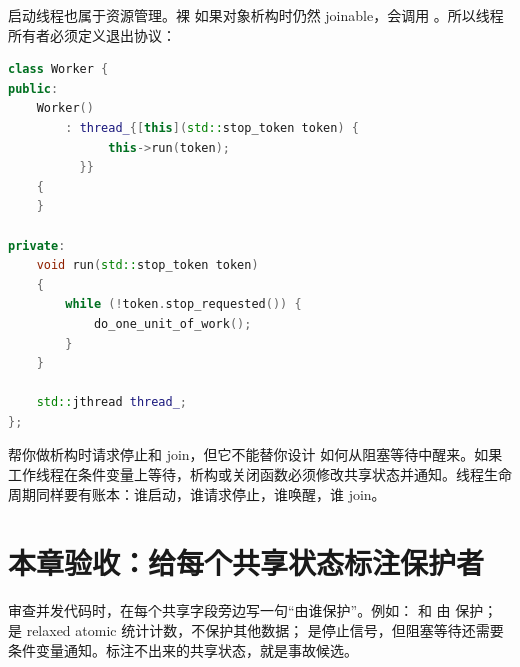 启动线程也属于资源管理。裸  如果对象析构时仍然 joinable，会调用 。所以线程所有者必须定义退出协议：

\begin{lstlisting}[language=C++,caption={工作线程所有者的基本形状}]
class Worker {
public:
    Worker()
        : thread_{[this](std::stop_token token) {
              this->run(token);
          }}
    {
    }

private:
    void run(std::stop_token token)
    {
        while (!token.stop_requested()) {
            do_one_unit_of_work();
        }
    }

    std::jthread thread_;
};
\end{lstlisting}

 帮你做析构时请求停止和 join，但它不能替你设计  如何从阻塞等待中醒来。如果工作线程在条件变量上等待，析构或关闭函数必须修改共享状态并通知。线程生命周期同样要有账本：谁启动，谁请求停止，谁唤醒，谁 join。

\section{本章验收：给每个共享状态标注保护者}

审查并发代码时，在每个共享字段旁边写一句“由谁保护”。例如： 和  由  保护； 是 relaxed atomic 统计计数，不保护其他数据； 是停止信号，但阻塞等待还需要条件变量通知。标注不出来的共享状态，就是事故候选。
